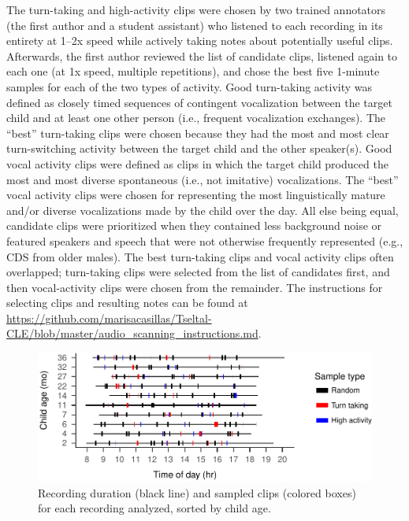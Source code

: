 \documentclass[floatsintext,man]{apa6}
\theoremstyle{definition}
\theoremstyle{definition}
\theoremstyle{definition}
\theoremstyle{remark}
\begin{document}
The turn-taking and high-activity clips were chosen by two trained
annotators (the first author and a student assistant) who listened to
each recording in its entirety at 1--2x speed while actively taking
notes about potentially useful clips. Afterwards, the first author
reviewed the list of candidate clips, listened again to each one (at 1x
speed, multiple repetitions), and chose the best five 1-minute samples
for each of the two types of activity. Good turn-taking activity was
defined as closely timed sequences of contingent vocalization between
the target child and at least one other person (i.e., frequent
vocalization exchanges). The \enquote{best} turn-taking clips were
chosen because they had the most and most clear turn-switching activity
between the target child and the other speaker(s). Good vocal activity
clips were defined as clips in which the target child produced the most
and most diverse spontaneous (i.e., not imitative) vocalizations. The
\enquote{best} vocal activity clips were chosen for representing the
most linguistically mature and/or diverse vocalizations made by the
child over the day. All else being equal, candidate clips were
prioritized when they contained less background noise or featured
speakers and speech that were not otherwise frequently represented
(e.g., CDS from older males). The best turn-taking clips and vocal
activity clips often overlapped; turn-taking clips were selected from
the list of candidates first, and then vocal-activity clips were chosen
from the remainder. The instructions for selecting clips and resulting
notes can be found at
\url{https://github.com/marisacasillas/Tseltal-CLE/blob/master/audio_scanning_instructions.md}.

\begin{figure}
\centering
\includegraphics{Tseltal-CLE_files/figure-latex/fig2-1.pdf}
\caption{\label{fig:fig2}Recording duration (black line) and sampled clips
(colored boxes) for each recording analyzed, sorted by child age.}
\end{figure}
\end{document}
